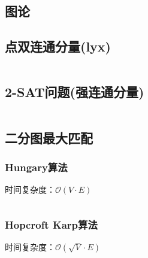 \documentclass[landscape, oneside, a4paper, cs4size]{book}
\newcommand{\cppcode}[1]{
	\inputminted[mathescape,
	frame=lines,linenos]{cpp}{source/#1}
}
\begin{document}
\begin{multicols}{2}
\begin{spacing}{0.8}
\section{图论}








\subsection{点双连通分量(lyx)}

\cppcode{graph-theory/pointtwo.cpp}




\subsection{2-SAT问题(强连通分量)}


\cppcode{graph-theory/two-satisfiability.cpp}


\subsection{二分图最大匹配}


\subsubsection{Hungary算法}


时间复杂度：$\mathcal{O}(V \cdot E)$


\cppcode{graph-theory/Hungarian.cpp}


\subsubsection{Hopcroft Karp算法}


时间复杂度：$\mathcal{O}(\sqrt{V} \cdot E)$


\cppcode{graph-theory/HK.cpp}



\end{spacing}
\end{multicols}
\end{document}
